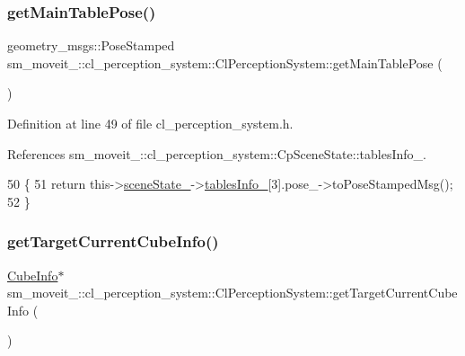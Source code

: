 \subsubsection{\texorpdfstring{get\+Main\+Table\+Pose()}{getMainTablePose()}}
{\footnotesize\ttfamily geometry\+\_\+msgs\+::\+Pose\+Stamped sm\+\_\+moveit\+\_\+::cl\+\_\+perception\+\_\+system\+::\+Cl\+Perception\+System\+::get\+Main\+Table\+Pose (\begin{DoxyParamCaption}{ }\end{DoxyParamCaption})\hspace{0.3cm}{\ttfamily [inline]}}



Definition at line 49 of file cl\+\_\+perception\+\_\+system.\+h.



References sm\+\_\+moveit\+\_\+::cl\+\_\+perception\+\_\+system\+::\+Cp\+Scene\+State\+::tables\+Info\+\_\+.


\begin{DoxyCode}
50             \{
51                 \textcolor{keywordflow}{return} this->\hyperlink{classsm__moveit__4_1_1cl__perception__system_1_1ClPerceptionSystem_a82ea8feeb2fa43349f91ed59137b3890}{sceneState\_}->\hyperlink{classsm__moveit__4_1_1cl__perception__system_1_1CpSceneState_a95f74dd16566d97e017650ccdf4b8a46}{tablesInfo\_}[3].pose\_->toPoseStampedMsg();
52             \}
\end{DoxyCode}
\mbox{\label{classsm__moveit__4_1_1cl__perception__system_1_1ClPerceptionSystem_ac4b944cebb2055a85a33129665df5dcf}} 
\subsubsection{\texorpdfstring{get\+Target\+Current\+Cube\+Info()}{getTargetCurrentCubeInfo()}}
{\footnotesize\ttfamily \hyperlink{structsm__moveit__4_1_1cl__perception__system_1_1CubeInfo}{Cube\+Info}$\ast$ sm\+\_\+moveit\+\_\+::cl\+\_\+perception\+\_\+system\+::\+Cl\+Perception\+System\+::get\+Target\+Current\+Cube\+Info (\begin{DoxyParamCaption}{ }\end{DoxyParamCaption})\hspace{0.3cm}{\ttfamily [inline]}}



